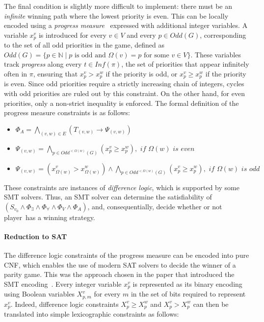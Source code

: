 \documentclass[a4paper,UKenglish,cleveref, autoref, thm-restate, anonymous]{lipics-v2021}
\begin{document}
The final condition is slightly more difficult to implement: there must be an \textit{infinite} winning path where the lowest priority is even. This can be locally encoded using a \textit{progress measure}~\cite{Heljanko:2012,Jurdziński:2000} expressed with additional integer variables. A variable $x_p^v$ is introduced for every $v \in V$ and every $p \in \textit{Odd}(G)$, corresponding to the set of all odd priorities in the game, defined as $\textit{Odd}(G) = \{ p\in {\mathbb N} \mid p \text{ is odd and } \Omega(v) = p \text{ for some } v \in V \}$. These variables track \textit{progress} along every $ t \in \textit{Inf}(\pi) $, the set of priorities that appear infinitely often in $\pi$, ensuring that $x_p^v > x_p^w$ if the priority is odd, or $x_p^v \geq x_p^w$ if the priority is even. Since odd priorities require a strictly increasing chain of integers, cycles with odd priorities are ruled out by this constraint. On the other hand, for even priorities, only a non-strict inequality is enforced.
%
The formal definition of the progress measure constraints is as follows:

\begin{itemize}
\item $\Phi_A = \bigwedge_{(v,w) \in E} \left(T_{(v,w)} \rightarrow \Psi_{(v,w)}\right)$
\item $\Psi_{(v,w)} = \bigwedge_{p \in \textit{Odd}^{<\Omega(w)}(G)} (x_p^v \geqslant x_p^w), \textit{ if } \Omega(w) \textit{ is even}$
\item $\Psi_{(v,w)} = (x_{\Omega(w)}^v > x_{\Omega(w)}^w) \land \bigwedge_{p \in \textit{Odd}^{<\Omega(w)}(G)} (x_p^v \geqslant x_p^w), \textit{ if } \Omega(w) \textit{ is odd}$
\end{itemize}

These constraints are instances of {\em difference logic}, which is supported by some SMT solvers. Thus, an SMT solver can determine the satisfiability of~$(S_{v_0} \wedge \Phi_{\exists} \wedge \Phi_{\forall} \wedge \Phi_V \wedge \Phi_A)$, and, consequentially, decide whether or not player~\even has a winning strategy.

\paragraph*{Reduction to SAT}

The difference logic constraints of the progress measure can be encoded into pure CNF, which enables the use of modern SAT solvers to decide the winner of a parity game. This was the approach chosen in the paper that introduced the SMT encoding~\cite{Heljanko:2012}. Every integer variable $x_p^v$ is represented as its binary encoding using Boolean variables $X_{p,m}^v$ for every $m$ in the set of bits required to represent $x_p^v$.  Indeed, difference logic constraints $X_p^v \geqslant X_p^w$ and $X_p^v > X_p^w$ can then be translated into simple lexicographic constraints as follows:
\end{document}
